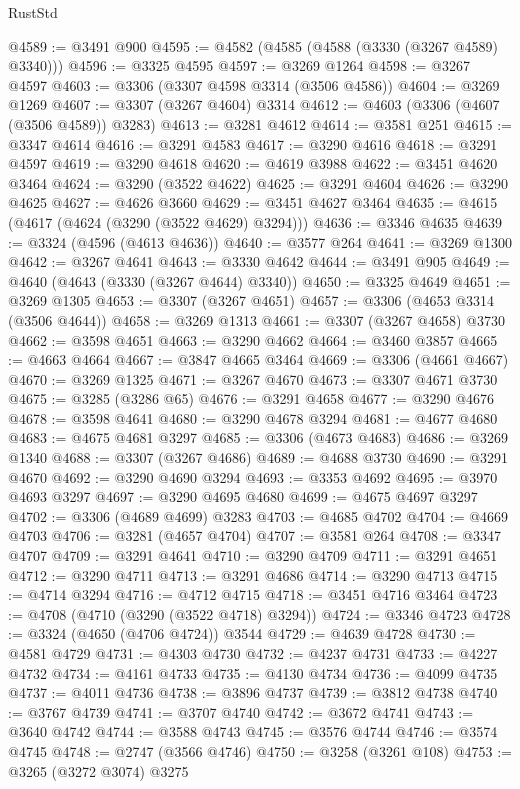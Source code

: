 \begin{lexlean}{RustStd}
\begin{coremodule}
@4589 := @3491 @900
@4595 := @4582 (@4585 (@4588 (@3330 (@3267 @4589) @3340)))
@4596 := @3325 @4595
@4597 := @3269 @1264
@4598 := @3267 @4597
@4603 := @3306 (@3307 @4598 @3314 (@3506 @4586))
@4604 := @3269 @1269
@4607 := @3307 (@3267 @4604) @3314
@4612 := @4603 (@3306 (@4607 (@3506 @4589)) @3283)
@4613 := @3281 @4612
@4614 := @3581 @251
@4615 := @3347 @4614
@4616 := @3291 @4583
@4617 := @3290 @4616
@4618 := @3291 @4597
@4619 := @3290 @4618
@4620 := @4619 @3988
@4622 := @3451 @4620 @3464
@4624 := @3290 (@3522 @4622)
@4625 := @3291 @4604
@4626 := @3290 @4625
@4627 := @4626 @3660
@4629 := @3451 @4627 @3464
@4635 := @4615 (@4617 (@4624 (@3290 (@3522 @4629) @3294)))
@4636 := @3346 @4635
@4639 := @3324 (@4596 (@4613 @4636))
@4640 := @3577 @264
@4641 := @3269 @1300
@4642 := @3267 @4641
@4643 := @3330 @4642
@4644 := @3491 @905
@4649 := @4640 (@4643 (@3330 (@3267 @4644) @3340))
@4650 := @3325 @4649
@4651 := @3269 @1305
@4653 := @3307 (@3267 @4651)
@4657 := @3306 (@4653 @3314 (@3506 @4644))
@4658 := @3269 @1313
@4661 := @3307 (@3267 @4658) @3730
@4662 := @3598 @4651
@4663 := @3290 @4662
@4664 := @3460 @3857
@4665 := @4663 @4664
@4667 := @3847 @4665 @3464
@4669 := @3306 (@4661 @4667)
@4670 := @3269 @1325
@4671 := @3267 @4670
@4673 := @3307 @4671 @3730
@4675 := @3285 (@3286 @65)
@4676 := @3291 @4658
@4677 := @3290 @4676
@4678 := @3598 @4641
@4680 := @3290 @4678 @3294
@4681 := @4677 @4680
@4683 := @4675 @4681 @3297
@4685 := @3306 (@4673 @4683)
@4686 := @3269 @1340
@4688 := @3307 (@3267 @4686)
@4689 := @4688 @3730
@4690 := @3291 @4670
@4692 := @3290 @4690 @3294
@4693 := @3353 @4692
@4695 := @3970 @4693 @3297
@4697 := @3290 @4695 @4680
@4699 := @4675 @4697 @3297
@4702 := @3306 (@4689 @4699) @3283
@4703 := @4685 @4702
@4704 := @4669 @4703
@4706 := @3281 (@4657 @4704)
@4707 := @3581 @264
@4708 := @3347 @4707
@4709 := @3291 @4641
@4710 := @3290 @4709
@4711 := @3291 @4651
@4712 := @3290 @4711
@4713 := @3291 @4686
@4714 := @3290 @4713
@4715 := @4714 @3294
@4716 := @4712 @4715
@4718 := @3451 @4716 @3464
@4723 := @4708 (@4710 (@3290 (@3522 @4718) @3294))
@4724 := @3346 @4723
@4728 := @3324 (@4650 (@4706 @4724)) @3544
@4729 := @4639 @4728
@4730 := @4581 @4729
@4731 := @4303 @4730
@4732 := @4237 @4731
@4733 := @4227 @4732
@4734 := @4161 @4733
@4735 := @4130 @4734
@4736 := @4099 @4735
@4737 := @4011 @4736
@4738 := @3896 @4737
@4739 := @3812 @4738
@4740 := @3767 @4739
@4741 := @3707 @4740
@4742 := @3672 @4741
@4743 := @3640 @4742
@4744 := @3588 @4743
@4745 := @3576 @4744
@4746 := @3574 @4745
@4748 := @2747 (@3566 @4746)
@4750 := @3258 (@3261 @108)
@4753 := @3265 (@3272 @3074) @3275

\end{coremodule}
\end{lexlean}
